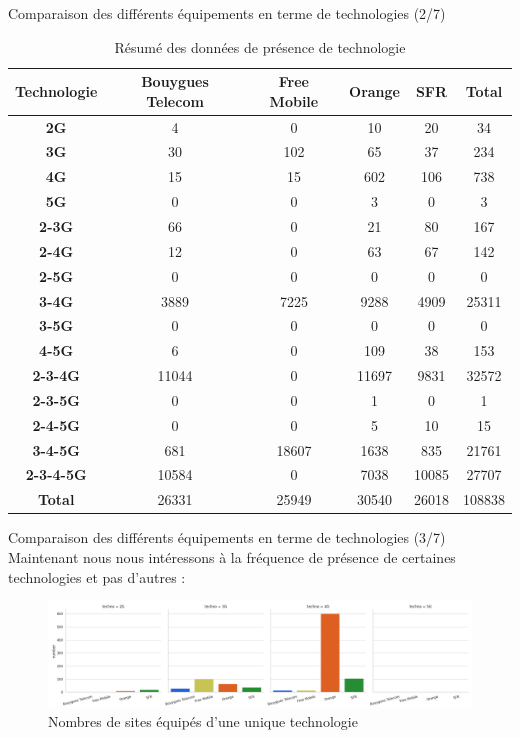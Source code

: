 \begin{frame}{Comparaison des différents équipements en terme de technologies (2/7)}
    \begin{table}[!ht]
        \centering
        \footnotesize
        \begin{tabular}{cccccc}
        \hline
            \textbf{Technologie} & \textbf{Bouygues Telecom} & \textbf{Free Mobile} & \textbf{Orange} & \textbf{SFR} & \textbf{Total} \\ \hline
            \textbf{2G} & 4 & 0 & 10 & 20 & 34 \\ 
            \textbf{3G} & 30 & 102 & 65 & 37 & 234 \\ 
            \textbf{4G} & 15 & 15 & 602 & 106 & 738 \\ 
            \textbf{5G} & 0 & 0 & 3 & 0 & 3 \\ 
            \textbf{2-3G} & 66 & 0 & 21 & 80 & 167 \\ 
            \textbf{2-4G} & 12 & 0 & 63 & 67 & 142 \\ 
            \textbf{2-5G} & 0 & 0 & 0 & 0 & 0 \\ 
            \textbf{3-4G} & 3889 & 7225 & 9288 & 4909 & 25311 \\ 
            \textbf{3-5G} & 0 & 0 & 0 & 0 & 0 \\ 
            \textbf{4-5G} & 6 & 0 & 109 & 38 & 153 \\ 
            \textbf{2-3-4G} & 11044 & 0 & 11697 & 9831 & 32572 \\ 
            \textbf{2-3-5G} & 0 & 0 & 1 & 0 & 1 \\ 
            \textbf{2-4-5G} & 0 & 0 & 5 & 10 & 15 \\ 
            \textbf{3-4-5G} & 681 & 18607 & 1638 & 835 & 21761 \\ 
            \textbf{2-3-4-5G} & 10584 & 0 & 7038 & 10085 & 27707 \\ 
            \textbf{Total} & 26331 & 25949 & 30540 & 26018 & 108838 \\ \hline
        \end{tabular}
        \caption{Résumé des données de présence de technologie}
    \end{table}
    
\end{frame}

\begin{frame}{Comparaison des différents équipements en terme de technologies (3/7)}
    Maintenant nous nous intéressons à la fréquence de présence de certaines technologies et pas d'autres :
    \begin{figure}
        \includegraphics[height=0.4\paperheight]{images/barplots/xG.png}
        \caption{\label{fig:xG}Nombres de sites équipés d'une unique technologie}
    \end{figure}
    
\end{frame}

